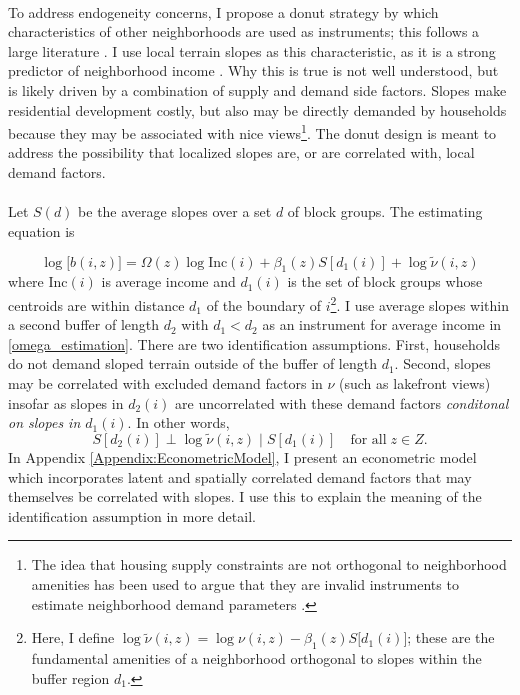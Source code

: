 \documentclass[12pt]{article}
\begin{document}
\paragraph*{}
To address endogeneity concerns, I propose a donut strategy by which characteristics of other neighborhoods are used as instruments; this follows a large literature \citep{BFMJPE, anagoletal2021, AmalgroetalChicagoDemos}. I use local terrain slopes as this characteristic, as it is a strong predictor of neighborhood income \citep{LeeandLin, saiz2010}. Why this is true is not well understood, but is likely driven by a combination of supply and demand side factors. Slopes make residential development costly, but also may be directly demanded by households because they may be associated with nice views\footnote{The idea that housing supply constraints are not orthogonal to neighborhood amenities has been used to argue that they are invalid instruments to estimate neighborhood demand parameters \citep{davidoffcritique}.}. The donut design is meant to address the possibility that localized slopes are, or are correlated with, local demand factors.

\paragraph*{}
 Let $S(d)$ be the average slopes over a set $d$ of block groups. The estimating equation is 

\begin{equation}\label{omega_estimation}
		\log\big[b(i, z)\big] = \Omega(z)\log\text{Inc}(i) + \beta_{1}(z)S[d_{1}(i)] + \log \tilde{\nu}(i, z)
\end{equation}
where $\text{Inc}(i)$ is average income and $d_{1}(i)$ is the set of block groups whose centroids are within distance $d_{1}$ of the boundary of $i$\footnote{Here, I define $\log \tilde{\nu}(i, z) = \log \nu(i, z) - \beta_{1}(z)S\big[d_{1}(i)\big]$; these are the fundamental amenities of a neighborhood orthogonal to slopes within the buffer region $d_{1}$.}. I use average slopes within a second buffer of length $d_{2}$ with $d_{1} < d_{2}$ as an instrument for average income in \eqref{omega_estimation}. There are two identification assumptions. First, households do not demand sloped terrain outside of the buffer of length $d_{1}$. Second, slopes may be correlated with excluded demand factors in $\nu$ (such as lakefront views) insofar as slopes in $d_{2}(i)$ are uncorrelated with these demand factors \textit{conditonal on slopes in $d_{1}(i)$}. In other words,
\begin{equation}
	S[d_{2}(i)] \perp \log \tilde{\nu}(i, z) \; | \; S[d_{1}(i)] \quad \text{for all} \; z \in Z.
\end{equation}
In Appendix \ref{Appendix:EconometricModel}, I present an econometric model which incorporates latent and spatially correlated demand factors that may themselves be correlated with slopes. I use this to explain the meaning of the identification assumption in more detail. 
\end{document}
